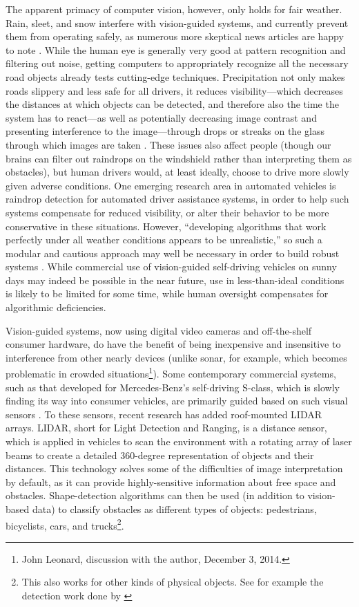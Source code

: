 The apparent primacy of computer vision, however, only holds for fair
weather. Rain, sleet, and 
snow interfere with vision-guided systems, and currently prevent them
from operating safely, as numerous more skeptical news articles are
happy to note \cite{knightFurther} \cite{gomesObstacles}.  While the
human eye is generally very good at
pattern recognition and filtering out noise, getting computers to
appropriately recognize all 
the necessary road objects already tests
cutting-edge techniques. Precipitation not only makes roads slippery
and less safe for all drivers, it reduces visibility---which decreases
the distances at which objects can be detected, and therefore also the
time the system has to react---as well as potentially decreasing image
contrast and presenting interference to the image---through drops or
streaks on the glass through which images are taken
\cite{rainADAS}. These issues also 
affect people (though our brains can filter out raindrops on the
windshield rather than interpreting them as obstacles), but human
drivers would, at least ideally, choose to drive more slowly given
adverse conditions. One emerging research area
in automated vehicles is raindrop detection for automated driver
assistance systems, in order to help such systems compensate for
reduced visibility, or alter their behavior to be more conservative in
these situations. However, ``developing algorithms that work perfectly
under all weather conditions appears to be unrealistic,'' so such a
modular and cautious approach may well be necessary in order to build
robust systems \cite[p. 50]{rainADAS}. While commercial use of
vision-guided self-driving vehicles on 
sunny days may indeed be possible in the near future, use in
less-than-ideal conditions is likely to be limited for some time,
while human oversight compensates for algorithmic deficiencies. 

Vision-guided systems, now using digital video cameras and
off-the-shelf consumer hardware, do have the benefit of being inexpensive
and insensitive to interference from other nearly devices (unlike
sonar, for example, which becomes problematic in crowded
situations\footnote{John Leonard, discussion with the author, December
3, 2014.}). Some contemporary commercial systems, such as that developed for Mercedes-Benz's
self-driving S-class, which is slowly finding its way into consumer
vehicles, are primarily guided based on such visual sensors \cite{makingBertha}. To
these sensors, recent research has added roof-mounted LIDAR arrays.
LIDAR, short for Light Detection and Ranging, is a distance
sensor, which is applied in vehicles to scan the environment with a
rotating array of laser beams to create a detailed 360-degree
representation of objects and their distances. This technology
solves some of the difficulties of image interpretation by default, as
it can provide highly-sensitive information about free space and
obstacles. Shape-detection algorithms can then be used (in addition to
vision-based data) to classify obstacles as different types of
objects: pedestrians, bicyclists, cars, and trucks\footnote{This also
  works for other kinds of physical objects. See for example the
  detection work done by \cite{fukuda}}.

